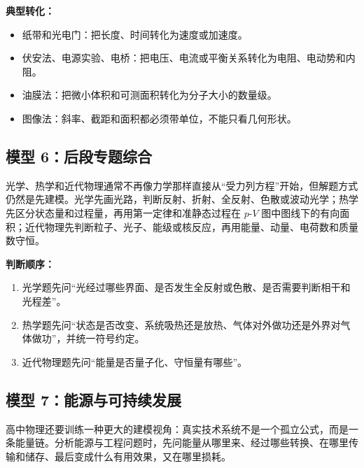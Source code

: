 \textbf{典型转化：}
\begin{itemize}
  \item 纸带和光电门：把长度、时间转化为速度或加速度。
  \item 伏安法、电源实验、电桥：把电压、电流或平衡关系转化为电阻、电动势和内阻。
  \item 油膜法：把微小体积和可测面积转化为分子大小的数量级。
  \item 图像法：斜率、截距和面积都必须带单位，不能只看几何形状。
\end{itemize}

\subsection*{模型 6：后段专题综合}

光学、热学和近代物理通常不再像力学那样直接从“受力列方程”开始，但解题方式仍然是先建模。光学先画光路，判断反射、折射、全反射、色散或波动光学；热学先区分状态量和过程量，再用第一定律和准静态过程在 $p$-$V$ 图中图线下的有向面积；近代物理先判断粒子、光子、能级或核反应，再用能量、动量、电荷数和质量数守恒。

\begin{center}


\label{fig:comprehensive-late-topics}
\end{center}

\textbf{判断顺序：}
\begin{enumerate}
  \item 光学题先问“光经过哪些界面、是否发生全反射或色散、是否需要判断相干和光程差”。
  \item 热学题先问“状态是否改变、系统吸热还是放热、气体对外做功还是外界对气体做功”，并统一符号约定。
  \item 近代物理题先问“能量是否量子化、守恒量有哪些”。
\end{enumerate}

\subsection*{模型 7：能源与可持续发展}

高中物理还要训练一种更大的建模视角：真实技术系统不是一个孤立公式，而是一条能量链。分析能源与工程问题时，先问能量从哪里来、经过哪些转换、在哪里传输和储存、最后变成什么有用效果，又在哪里损耗。

\begin{center}


\label{fig:energy-sustainable-system}
\end{center}

